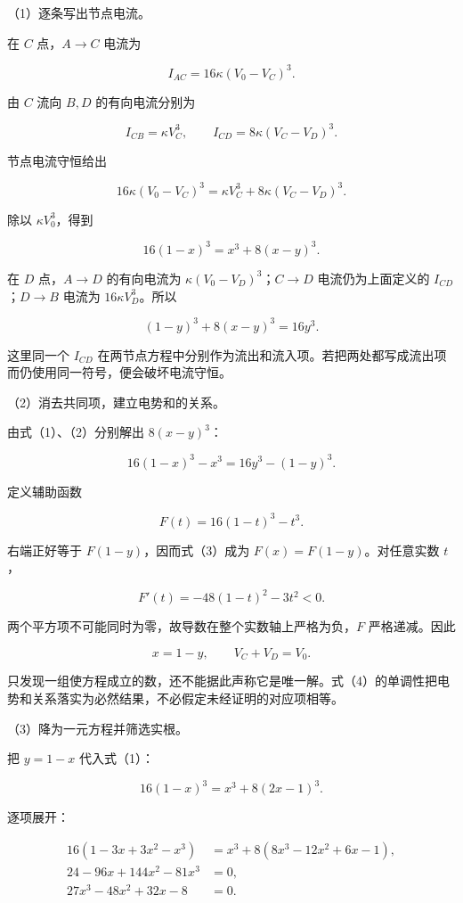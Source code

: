 \documentclass[12pt,a4paper,fontset=fandol]{ctexart}
\begin{document}
（1）逐条写出节点电流。

在 \(C\) 点，\(A\to C\) 电流为

\[
I_{AC}=16\kappa(V_0-V_C)^3.
\]

由 \(C\) 流向 \(B,D\) 的有向电流分别为

\[
I_{CB}=\kappa V_C^3,\qquad I_{CD}=8\kappa(V_C-V_D)^3.
\]

节点电流守恒给出

\[
16\kappa(V_0-V_C)^3=\kappa V_C^3+8\kappa(V_C-V_D)^3.
\]

除以 \(\kappa V_0^3\)，得到

\[
16(1-x)^3=x^3+8(x-y)^3. \tag{1}
\]

在 \(D\) 点，\(A\to D\) 的有向电流为 \(\kappa(V_0-V_D)^3\)；\(C\to D\)
电流仍为上面定义的 \(I_{CD}\)；\(D\to B\) 电流为
\(16\kappa V_D^3\)。所以

\[
(1-y)^3+8(x-y)^3=16y^3. \tag{2}
\]

这里同一个 \(I_{CD}\)
在两节点方程中分别作为流出和流入项。若把两处都写成流出项而仍使用同一符号，便会破坏电流守恒。

（2）消去共同项，建立电势和的关系。

由式（1）、（2）分别解出 \(8(x-y)^3\)：

\[
16(1-x)^3-x^3=16y^3-(1-y)^3. \tag{3}
\]

定义辅助函数

\[
F(t)=16(1-t)^3-t^3.
\]

右端正好等于 \(F(1-y)\)，因而式（3）成为 \(F(x)=F(1-y)\)。对任意实数
\(t\)，

\[
F'(t)=-48(1-t)^2-3t^2<0. \tag{4}
\]

两个平方项不可能同时为零，故导数在整个实数轴上严格为负，\(F\)
严格递减。因此

\[
x=1-y,\qquad V_C+V_D=V_0. \tag{5}
\]

只发现一组使方程成立的数，还不能据此声称它是唯一解。式（4）的单调性把电势和关系落实为必然结果，不必假定未经证明的对应项相等。

（3）降为一元方程并筛选实根。

把 \(y=1-x\) 代入式（1）：

\[
16(1-x)^3=x^3+8(2x-1)^3.
\]

逐项展开：

\[
\begin{aligned}
16(1-3x+3x^2-x^3)
&=x^3+8(8x^3-12x^2+6x-1),\\
24-96x+144x^2-81x^3&=0,\\
27x^3-48x^2+32x-8&=0.
\end{aligned}
\]
\end{document}
